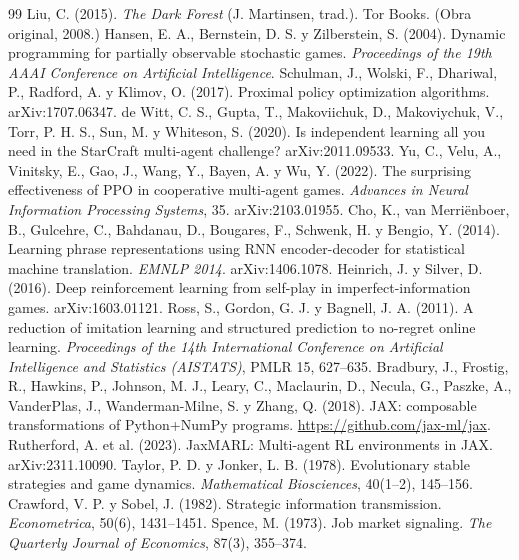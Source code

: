 \documentclass[11pt,a4paper]{article}
\begin{document}
\begin{thebibliography}{99}
\small
{} Liu, C. (2015). \textit{The Dark Forest} (J. Martinsen, trad.). Tor Books. (Obra original, 2008.)
 Hansen, E. A., Bernstein, D. S. y Zilberstein, S. (2004). Dynamic programming for partially observable stochastic games. \textit{Proceedings of the 19th AAAI Conference on Artificial Intelligence}.
 Schulman, J., Wolski, F., Dhariwal, P., Radford, A. y Klimov, O. (2017). Proximal policy optimization algorithms. arXiv:1707.06347.
 de Witt, C. S., Gupta, T., Makoviichuk, D., Makoviychuk, V., Torr, P. H. S., Sun, M. y Whiteson, S. (2020). Is independent learning all you need in the StarCraft multi-agent challenge? arXiv:2011.09533.
 Yu, C., Velu, A., Vinitsky, E., Gao, J., Wang, Y., Bayen, A. y Wu, Y. (2022). The surprising effectiveness of PPO in cooperative multi-agent games. \textit{Advances in Neural Information Processing Systems}, 35. arXiv:2103.01955.
 Cho, K., van Merri\"enboer, B., Gulcehre, C., Bahdanau, D., Bougares, F., Schwenk, H. y Bengio, Y. (2014). Learning phrase representations using RNN encoder-decoder for statistical machine translation. \textit{EMNLP 2014}. arXiv:1406.1078.
 Heinrich, J. y Silver, D. (2016). Deep reinforcement learning from self-play in imperfect-information games. arXiv:1603.01121.
 Ross, S., Gordon, G. J. y Bagnell, J. A. (2011). A reduction of imitation learning and structured prediction to no-regret online learning. \textit{Proceedings of the 14th International Conference on Artificial Intelligence and Statistics (AISTATS)}, PMLR 15, 627--635.
 Bradbury, J., Frostig, R., Hawkins, P., Johnson, M. J., Leary, C., Maclaurin, D., Necula, G., Paszke, A., VanderPlas, J., Wanderman-Milne, S. y Zhang, Q. (2018). JAX: composable transformations of Python+NumPy programs. \url{https://github.com/jax-ml/jax}.
 Rutherford, A. et al. (2023). JaxMARL: Multi-agent RL environments in JAX. arXiv:2311.10090.
 Taylor, P. D. y Jonker, L. B. (1978). Evolutionary stable strategies and game dynamics. \textit{Mathematical Biosciences}, 40(1--2), 145--156.
 Crawford, V. P. y Sobel, J. (1982). Strategic information transmission. \textit{Econometrica}, 50(6), 1431--1451.
 Spence, M. (1973). Job market signaling. \textit{The Quarterly Journal of Economics}, 87(3), 355--374.

\end{thebibliography}
\end{document}
